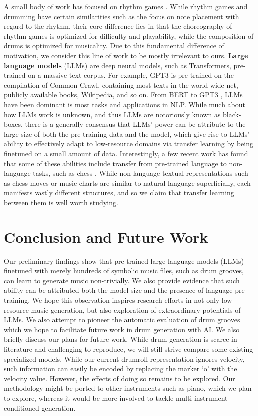 \documentclass[letterpaper]{article} %
\begin{document}
A small body of work has focused on rhythm games \cite{donahue2017dance,liang2019procedural}. While rhythm games and drumming have certain similarities such as the focus on note placement with regard to the rhythm, their core difference lies in that the choreography of rhythm games is optimized for difficulty and playability, while the composition of drums is optimized for musicality. Due to this fundamental difference of motivation, we consider this line of work to be mostly irrelevant to ours.  \textbf{Large language models} (LLMs) are deep neural models, such as Transformers, pre-trained on a massive text corpus. For example, GPT3 is pre-trained on the compilation of Common Crawl, containing most texts in the world wide net, publicly available books, Wikipedia, and so on. From BERT \cite{devlin-etal-2019-bert} to GPT3 \cite{NEURIPS2020_1457c0d6}, LLMs have been dominant is most tasks and applications in NLP. While much about how LLMs work is unknown, and thus LLMs are notoriously known as black-boxes, there is a generally consensus that LLMs' power can be attribute to the large size of both the pre-training data and the model, which give rise to LLMs' ability to effectively adapt to low-resource domains via transfer learning by being finetuned on a small amount of data. Interestingly, a few recent work has found that some of these abilities include transfer from pre-trained language to non-language tasks, such as chess \cite{stockl-2021-watching}. While non-language textual representations such as chess moves or music charts are similar to natural language superficially, each manifests vastly different structures, and so we claim that transfer learning between them is well worth studying.

\vspace{-3.02mm}
\section{Conclusion and Future Work}
Our preliminary findings show that pre-trained large language models (LLMs) finetuned with merely hundreds of symbolic music files, such as drum grooves, can learn to generate music non-trivially. We also provide evidence that such ability can be attributed both the model size and the presence of language pre-training. We hope this observation inspires research efforts in not only low-resource music generation, but also exploration of extraordinary potentials of LLMs. We also attempt to pioneer the automatic evaluation of drum grooves which we hope to facilitate future work in drum generation with AI.  We also briefly discuss our plans for future work. While drum generation is scarce in literature and challenging to reproduce, we will still strive compare some existing specialized models. While our current drumroll representation ignores velocity, such information can easily be encoded by replacing the marker `o' with the velocity value. However, the effects of doing so remains to be explored. Our methodology might be ported to other instruments such as piano, which we plan to explore, whereas it would be more involved to tackle multi-instrument conditioned generation.
\end{document}
